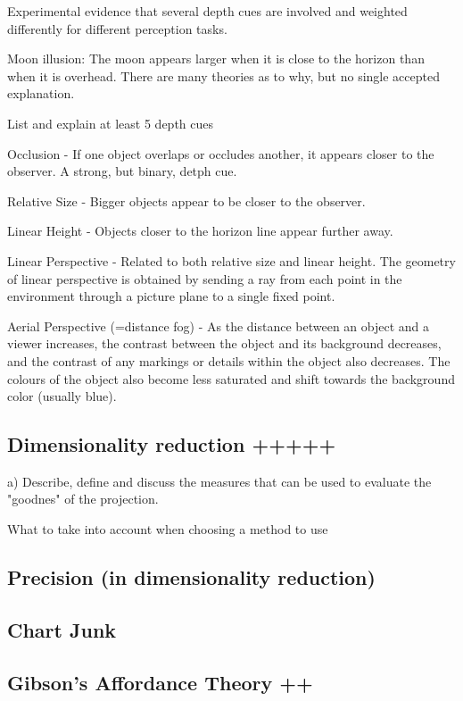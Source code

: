 \documentclass[a4paper]{article}
\begin{document}
Experimental evidence that several depth cues are involved and weighted differently for different perception tasks.

Moon illusion: The moon appears larger when it is close to the horizon than when it is overhead. There are many theories as to why, but no single accepted explanation.


List and explain at least 5 depth cues

Occlusion - If one object overlaps or occludes another, it appears closer to the observer. A strong, but binary, detph cue.

Relative Size - Bigger objects appear to be closer to the observer.

Linear Height - Objects closer to the horizon line appear further away.

Linear Perspective - Related to both relative size and linear height. The geometry of linear perspective is obtained by sending a ray from each point in the environment through a picture plane to a single fixed point.

Aerial Perspective (=distance fog) - As the distance between an object and a viewer increases, the contrast between the object and its background decreases, and the contrast of any markings or details within the object also decreases. The colours of the object also become less saturated and shift towards the background color (usually blue).

\subsection{Dimensionality reduction +++++}

a) Describe, define and discuss the measures that can be used to evaluate the "goodnes" of the projection.

What to take into account when choosing a method to use

\subsection{Precision (in dimensionality reduction)}

\subsection{Chart Junk}

\subsection{Gibson's Affordance Theory ++}
\end{document}
